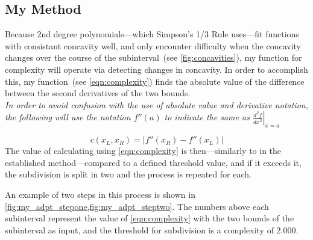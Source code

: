 \documentclass{paper}
\begin{document}
\subsection{My Method}
\label{sec:my_method}
Because 2nd degree polynomials---which Simpson's 1/3 Rule uses---fit functions with consistant concavity well, and only encounter difficulty when the concavity changes over the course of the subinterval~(see \cref{fig:concavities}), my function for complexity will operate via detecting changes in concavity.
In order to accomplish this, my function~(see \cref{eqn:complexity}) finds the absolute value of the difference between the second derivatives of the two bounds.\\
\emph{In order to avoid confusion with the use of absolute value and derivative notation, the following will use the notation \(f''(a)\) to indicate the same as \(\left.\frac{d^2f}{dx^2}\right|_{x=a}\)}
%

%
\begin{equation}
    \label{eqn:complexity}
    c(x_L, x_R) = \left|f''(x_R) - f''(x_L)\right|
\end{equation}
%
The value of calculating using \cref{eqn:complexity} is then---similarly to in the established method---compared to a defined threshold value, and if it exceeds it, the subdivision is split in two and the process is repeated for each.

An example of two steps in this process is shown in \cref{fig:my_adpt_stepone,fig:my_adpt_steptwo}.
The numbers above each subinterval represent the value of \cref{eqn:complexity} with the two bounds of the subinterval as input, and the threshold for subdivision is a complexity of \(2.000\).
%


\end{document}

